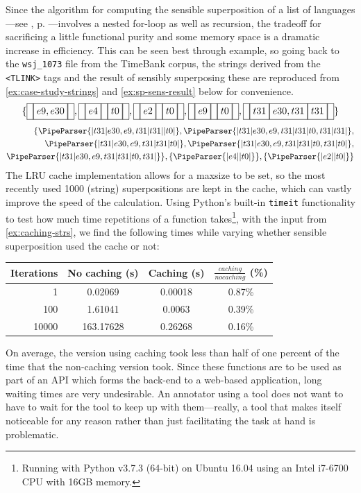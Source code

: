 \documentclass[a4paper,12pt,leqno]{article}
\newcommand{\vph}[1]{\vphantom{#1}}
\newcommand{\ebox}[1]{\fbox{$\vph{'(),}#1$}}
\newcommand{\nbBefore}[2]{\ebox{#1}\ebox{}\ebox{#2}}
\newcommand{\nbDuring}[2]{\ebox{#2}\ebox{#1,#2}\ebox{#2}}
\newcommand{\nbEquals}[2]{\ebox{#1,#2}}
\newcommand{\Before}[2]{\ebox{}\nbBefore{#1}{#2}\ebox{}}
\newcommand{\During}[2]{\ebox{}\nbDuring{#1}{#2}\ebox{}}
\newcommand{\Equals}[2]{\ebox{}\nbEquals{#1}{#2}\ebox{}}
\newcommand{\EventString}[1]{%
	\renewcommand*{\do}[1]{\ebox{##1}}%
	\PipeParser{#1}%
}
\begin{document}
Since the algorithm for computing the sensible superposition of a list of languages---see , p. \pageref{fig:pseudo-code-spsens}---involves a nested for-loop as well as recursion, the tradeoff for sacrificing a little functional purity and some memory space is a dramatic increase in efficiency. This can be seen best through example, so going back to the \verb|wsj_1073| file from the TimeBank corpus, the strings derived from the \verb|<TLINK>| tags and the result of sensibly superposing these are reproduced from \cref{ex:case-study-strings} and \cref{ex:sp-sens-result} below for convenience.
\begin{align}
	\{\Equals{e9}{e30}, \Before{e4}{t0}, \Before{e2}{t0}, \Before{e9}{t0}, \During{e30}{t31}\}\label{ex:caching-strs}
\end{align}
\begin{align}
	\{\EventString{{}|t31|e30,e9,t31|t31|{}|t0|{}}, \EventString{{}|t31|e30,e9,t31|t31|t0,t31|t31|{}},\\
	\EventString{{}|t31|e30,e9,t31|t31|t0|{}}, \EventString{{}|t31|e30,e9,t31|t31|t0,t31|t0|{}},\notag\\
	\EventString{{}|t31|e30,e9,t31|t31|t0,t31|{}}\}, \{\EventString{{}|e4|{}|t0|{}}\}, \{\EventString{{}|e2|{}|t0|{}}\}\notag
\end{align}
The LRU cache implementation allows for a maxsize to be set, so the most recently used 1000 (string) superpositions are kept in the cache, which can vastly improve the speed of the calculation. Using Python's built-in \verb|timeit| functionality to test how much time repetitions of a function takes\footnote{Running with Python v3.7.3 (64-bit) on Ubuntu 16.04 using an Intel i7-6700 CPU with 16GB memory.}, with the input from \cref{ex:caching-strs}, we find the following times while varying whether sensible superposition used the cache or not:
\begin{center}
	\footnotesize
	\begin{tabular}[h!]{|r|c  c  c|}
		\hline
		\textbf{Iterations} & \textbf{No caching (s)} & \textbf{Caching (s)} & $\frac{caching}{no caching}$ (\%)\\
		\hline
		1 & 0.02069 & 0.00018 & 0.87\%\\
		100 & 1.61041 & 0.0063 & 0.39\%\\%
		10000 & 163.17628 & 0.26268 & 0.16\%\\%
		\hline
	\end{tabular}
\end{center}
On average, the version using caching took less than half of one percent of the time that the non-caching version took. Since these functions are to be used as part of an API which forms the back-end to a web-based application, long waiting times are very undesirable. An annotator using a tool does not want to have to wait for the tool to keep up with them---really, a tool that makes itself noticeable for any reason rather than just facilitating the task at hand is problematic.
\end{document}
